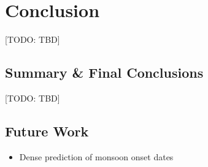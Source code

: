 \chapter{Conclusion}
\label{c:conclusion}
[TODO: TBD]

\section{Summary \& Final Conclusions}
[TODO: TBD]

\section{Future Work}
\begin{itemize}
  \item Dense prediction of monsoon onset dates
\end{itemize}
